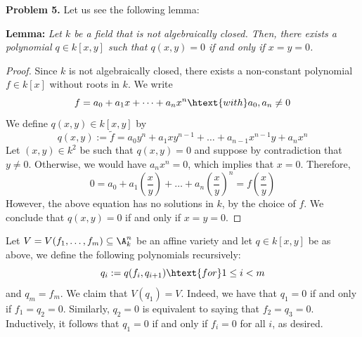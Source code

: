 \documentclass{article}
\begin{document}
\newpage
\noindent\textbf{Problem 5.} Let us see the following lemma:

\vspace{1mm}
\noindent\textbf{Lemma:} \emph{Let $k$ be a field that is not algebraically closed. Then, there
exists a polynomial $q\in k[x,y]$ such that $q(x,y)=0$ if and only if $x=y=0$.}

\begin{proof}
    Since $k$ is not algebraically closed, there exists a non-constant polynomial $f\in k[x]$
    without roots in $k$. We write
    \begin{equation*}
        f=a_{0}+a_{1}x+\dots+a_{n}x^{n} \htext{with}a_{0},a_{n}\neq0
    \end{equation*}
    We define $q(x,y)\in k[x,y]$ by
    \begin{equation*}
        q(x,y):=\widetilde{f}=a_{0}y^{n}+a_{1}xy^{n-1}+\dots+a_{n-1}x^{n-1}y+a_{n}x^{n}
    \end{equation*}
    Let $(x,y)\in k^{2}$ be such that $q(x,y)=0$ and suppose by contradiction that $y\neq0$. 
    Otherwise, we would have $a_{n}x^{n}=0$, which implies that $x=0$. Therefore,
    \begin{equation*}
        0=a_{0}+a_{1}\left(\frac{x}{y}\right)+\dots+a_{n}\left(\frac{x}{y}\right)^{n}
        =f\left(\frac{x}{y}\right)
    \end{equation*}
    However, the above equation has no solutions in $k$, by the choice of $f$. We conclude
    that $q(x,y)=0$ if and only if $x=y=0$.
\end{proof}

\noindent Let $V=V(f_{1},\dots,f_{m})\subseteq\A_{k}^{n}$ be an affine variety and let 
$q\in k[x,y]$ be as above, we define the following polynomials recursively:
\begin{equation*}
    q_{i}:=q(f_{i},q_{i+1}) \htext{for}1\leq i<m
\end{equation*}
and $q_{m}=f_{m}$. We claim that $V(q_{1})=V$. Indeed, we have that $q_{1}=0$ if and only if 
$f_{1}=q_{2}=0$. Similarly, $q_{2}=0$ is equivalent to saying that $f_{2}=q_{3}=0$. Inductively, 
it follows that $q_{1}=0$ if and only if $f_{i}=0$ for all $i$, as desired.
\end{document}
